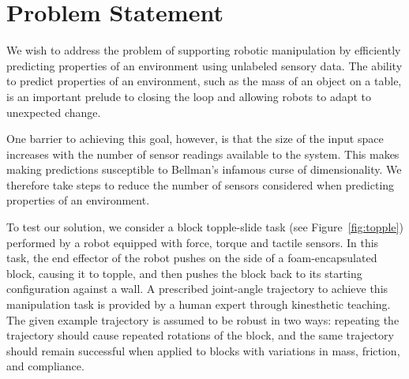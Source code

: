 

\section{Problem Statement}

We wish to address the problem of supporting robotic manipulation by efficiently predicting properties of an environment using unlabeled sensory data.
The ability to predict properties of an environment, such as the mass of an object on a table, is an important prelude to closing the loop and allowing robots to adapt to unexpected change.

One barrier to achieving this goal, however, is that the size of the input space increases with the number of sensor readings available to the system.
This makes making predictions susceptible to Bellman's infamous curse of dimensionality.
We therefore take steps to reduce the number of sensors considered when predicting properties of an environment.

To test our solution, we consider a block topple-slide task (see Figure~\ref{fig:topple}) performed by a robot equipped with force, torque and tactile sensors.
In this task, the end effector of the robot pushes on the side of a foam-encapsulated block, causing it to topple, and then pushes the block back to its starting configuration against a wall.
A prescribed joint-angle trajectory to achieve this manipulation task is provided by a human expert through kinesthetic teaching.
The given example trajectory is assumed to be robust in two ways: repeating the trajectory should cause repeated rotations of the block, and the same trajectory should remain successful when applied to blocks with variations in mass, friction, and compliance. 


